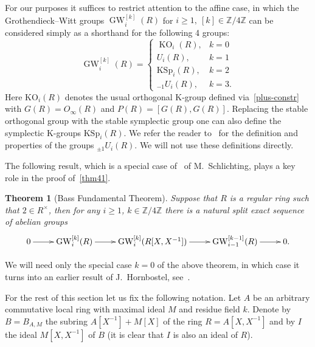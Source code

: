 \documentclass[oneside, 8pt]{amsart}
\newtheorem{externaltheorem}[lemma]{Theorem}
\theoremstyle{remark}
\theoremstyle{definition}
\numberwithin{lemma}{section}
\numberwithin{prop}{section}
\numberwithin{corollary}{section}
\numberwithin{externaltheorem}{section}
\DeclareMathOperator{\KO}{KO}
\DeclareMathOperator{\GW}{GW}
\newcommand{\ZZ}{\mathbb{Z}}
\numberwithin{equation}{section}
\begin{document}
For our purposes it suffices to restrict attention to the affine case, in which  the Grothendieck--Witt groups $\GW_i^{[k]}(R)$ for $i \geq 1,\ [k] \in \ZZ/4\ZZ$ can be considered simply as a shorthand for the following 4 groups:
\begin{equation} \label{GW-concrete} \GW_i^{[k]}(R) = \left\{\begin{array}{ll} \KO_i(R), & k = 0 \\ U_i(R), & k = 1 \\ \mathrm{KSp}_i(R), & k = 2 \\ {}_{-1}\!U_i(R), & k = 3. \end{array}\right. \end{equation}
Here $\mathrm{KO}_i(R)$ denotes the usual orthogonal K-group defined via~\eqref{plus-constr} with $G(R) = O_\infty(R)$ and $P(R) = [G(R), G(R)]$.
Replacing the stable orthogonal group with the stable symplectic group one can also define the symplectic K-groups $\mathrm{KSp}_i(R)$.
We refer the reader to~\cite{Ka80} for the definition and properties of the groups ${}_{\pm 1}\!U_i(R)$. We will not use these definitions directly.

The following result, which is a special case of~\cite[Theorem~9.13]{Sch16} of M.~Schlichting, plays a key role in the proof of~\cref{thm41}.
\begin{externaltheorem}[Bass Fundamental Theorem]\label{bass-ft} Suppose that $R$ is a regular ring such that $2 \in R^\times$, 
then for any $i\geq 1$, $k\in \ZZ/4\ZZ$ there is a natural split exact sequence of abelian groups \[ \xymatrix{ 0 \ar[r] & \GW_i^{[k]}(R) \ar[r] & \GW_i^{[k]}(R[X, X^{-1}]) \ar[r]  & \GW_{i-1}^{[k-1]}(R) \ar[r] & 0.} \] \end{externaltheorem}
We will need only the special case $k=0$ of the above theorem, in which case it turns into an earlier result of J.~Hornbostel, see~\cite[Corollary~5.3]{Ho05}.

For the rest of this section let us fix the following notation.
Let $A$ be an arbitrary commutative local ring with maximal ideal $M$ and residue field $k$.
Denote by $B = B_{A, M}$ the subring $A[X^{-1}] + M[X]$ of the ring $R = A[X, X^{-1}]$ and
by $I$ the ideal $M[X, X^{-1}]$ of $B$ (it is clear that $I$ is also an ideal of $R$).
\end{document}
